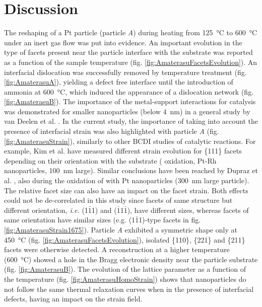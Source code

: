 \section{Discussion}

The reshaping of a Pt particle (particle \textit{A}) during heating from \qty{125}{\degreeCelsius} to \qty{600}{\degreeCelsius} under an inert gas flow was put into evidence.
An important evolution in the type of facets present near the particle interface with the substrate was reported as a function of the sample temperature (fig. \ref{fig:AmaterasuFacetsEvolution}).
An interfacial dislocation was successfully removed by temperature treatment (fig. \ref{fig:AmaterasuA}), yielding a defect free interface until the introduction of ammonia at \qty{600}{\degreeCelsius}, which induced the appearance of a dislocation network (fig. \ref{fig:AmaterasuB}).
The importance of the metal-support interactions for catalysis was demonstrated for smaller nanoparticles (below \qty{4}{\nm}) in a general study by van Deelen et al. \parencite*{vanDeelen2019}.
In the current study, the importance of taking into account the presence of interfacial strain was also highlighted with particle \textit{A} (fig. \ref{fig:AmaterasuStrain}), similarly to other BCDI studies of catalytic reactions.
For example, Kim et al. \parencite*{Kim2021} have measured different strain evolution for \{111\} facets depending on their orientation with the  substrate ( oxidation, Pt-Rh nanoparticles, \qty{100}{\nm} large).
Similar conclusions have been reached by Dupraz et al. \parencite*{Dupraz2022}, also during the oxidation of  with Pt nanoparticles (\qty{300}{\nm} large particle).
The relative facet size can also have an impact on the facet strain.
Both effects could not be de-correlated in this study since facets of same structure but different orientation, \textit{i.e.} (1$\bar{1}$1) and ($\bar{1}$1$\bar{1}$), have different sizes, whereas facets of same orientation have similar sizes (e.g. (1$\bar{1}$1)-type facets in fig. \ref{fig:AmaterasuStrain1675}).
Particle \textit{A} exhibited a symmetric shape only at \qty{450}{\degreeCelsius} (fig. \ref{fig:AmaterasuFacetsEvolution}), isolated \{110\}, \{221\} and \{211\} facets were otherwise detected.
A reconstruction at a higher temperature (\qty{600}{\degreeCelsius}) showed a hole in the Bragg electronic density near the particle substrate (fig. \ref{fig:AmaterasuB}).
The evolution of the lattice parameter as a function of the temperature (fig. \ref{fig:AmaterasuHomoStrain}) shows that nanoparticles do not follow the same thermal relaxation curves when in the presence of interfacial defects, having an impact on the strain field.

